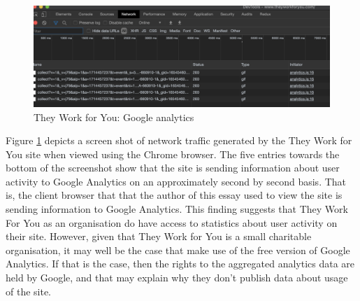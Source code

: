 \begin{figure}[h]
  \centering
  \includegraphics[scale=0.25]{images/they-work-for-you-challenges-google-analytics}
  \caption{They Work for You: Google analytics}
  \label{fig:they-work-for-you-challenges-google-analytics}
\end{figure}

Figure \ref{fig:they-work-for-you-challenges-google-analytics} depicts a screen shot of network traffic generated by the They Work for You site when viewed using the Chrome browser.
The five entries towards the bottom of the screenshot show that the site is sending information about user activity to Google Analytics \cite{google-analytics} on an approximately second by second basis.
That is, the client browser that that the author of this essay used to view the site is sending information to Google Analytics.
This finding suggests that They Work For You as an organisation do have access to statistics about user activity on their site.
However, given that They Work for You is a small charitable organisation, it may well be the case that make use of the free version of Google Analytics.
If that is the case, then the rights to the aggregated analytics data are held by Google, and that may explain why they don’t publish data about usage of the site.
